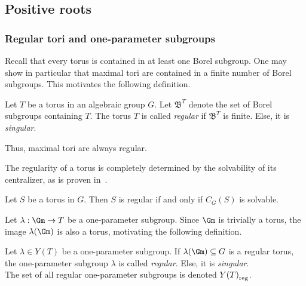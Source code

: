 \subsection{Positive roots}
\subsubsection{Regular tori and one-parameter subgroups}

Recall that every torus is contained in at least one Borel subgroup. One may show in particular that maximal tori are contained in a finite number of Borel subgroups. This motivates the following definition.
\begin{defn}
    Let $T$ be a torus in an algebraic group $G$. Let $\mathfrak{B}^T$ denote the set of Borel subgroups containing $T$. The torus $T$ is called \emph{regular} if $\mathfrak{B}^T$ is finite. Else, it is \emph{singular}.
\end{defn}
Thus, maximal tori are always regular.

The regularity of a torus is completely determined by the solvability of its centralizer, as is proven in~\cite[Section~24.2]{humphreys_linear_1975}.
\begin{theorem}\label{thm:regular_torus}
    Let $S$ be a torus in $G$. Then $S$ is regular if and only if $C_G(S)$ is solvable.
\end{theorem}

Let $\lambda: \Gm \to T$ be a one-parameter subgroup. Since $\Gm$ is trivially a torus, the image $\lambda(\Gm)$ is also a torus, motivating the following definition.
\begin{defn}
    Let $\lambda \in Y(T)$ be a one-parameter subgroup. If $\lambda(\Gm) \subseteq G$ is a regular torus, the one-parameter subgroup $\lambda$ is called \emph{regular}. Else, it is \emph{singular}. \\
    The set of all regular one-parameter subgroups is denoted ${Y(T)}_{\textnormal{reg}}$.
\end{defn}

